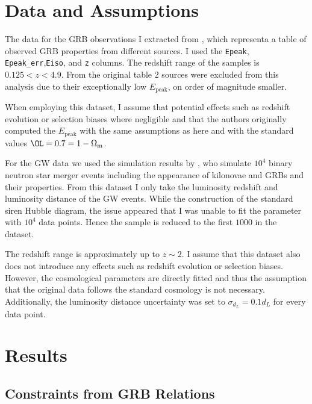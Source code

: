 \documentclass[
    aps,
    prd,
    twocolumn,
    nofootinbib,
    floatfix,
    superscriptaddress
]{revtex4-2}
\newcommand{\Om}{\Omega_{\mathrm{m}}}
\newcommand{\Ep}{E_\mathrm{peak}}
\begin{document}
\section{Data and Assumptions}\label{sec:data}

The data for the GRB observations I extracted from \cite{ghirlanda2008peak}, which representa a table of observed GRB properties from different sources. I used the \verb|Epeak|, \verb|Epeak_err|,\verb|Eiso|,  and \verb|z| columns. The redshift range of the samples is $0.125<z<4.9$. From the original table 2 sources were excluded from this analysis due to their exceptionally low $\Ep$, on order of magnitude smaller.

When employing this dataset, I assume that potential effects such as redshift evolution or selection biases where negligible and that the authors originally computed the $\Ep$ with the same assumptions as here and with the standard values $\OL = 0.7 = 1-\Om$.

For the GW data we used the simulation results by \cite{colombo2025multi}, who simulate $10^4$ binary neutron star merger events including the appearance of kilonovae and GRBs and their properties. From this dataset I only take the luminosity redshift and luminosity distance of the GW events. While the construction of the standard siren Hubble diagram, the issue appeared that I was unable to fit the parameter with $10^4$ data points. Hence the sample is reduced to the first $1000$ in the dataset.

The redshift range is approximately up to $z\sim2$. I assume that this dataset also does not introduce any effects such as redshift evolution or selection biases. However, the cosmological parameters are directly fitted and thus the assumption that the original data follows the standard cosmology is not necessary. Additionally, the luminosity distance uncertainty was set to $\sigma_{d_L} = 0.1 d_L$ for every data point.

\section{Results}\label{sec:results}

\subsection{Constraints from GRB Relations}
\end{document}
